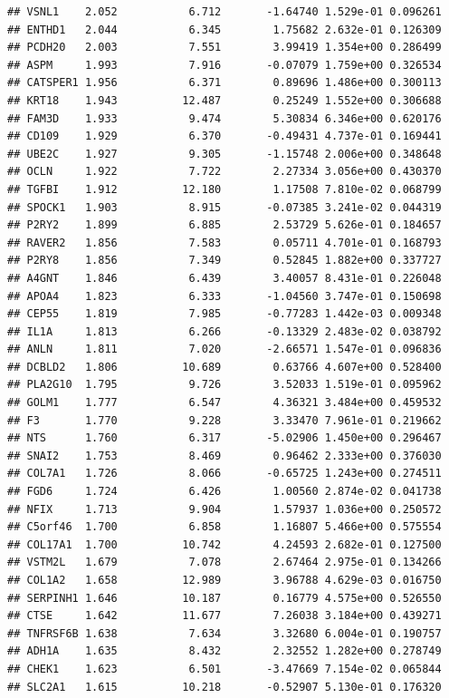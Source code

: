 \documentclass{article}\usepackage[]{graphicx}\usepackage[]{color}
\makeatletter
\newenvironment{kframe}{%
 \def\at@end@of@kframe{}%
 \ifinner\ifhmode%
  \def\at@end@of@kframe{\end{minipage}}%
  \begin{minipage}{\columnwidth}%
 \fi\fi%
 \def\FrameCommand##1{\hskip\@totalleftmargin \hskip-\fboxsep
 \colorbox{shadecolor}{##1}\hskip-\fboxsep
     \hskip-\linewidth \hskip-\@totalleftmargin \hskip\columnwidth}%
 \MakeFramed {\advance\hsize-\width
   \@totalleftmargin\z@ \linewidth\hsize
   \@setminipage}}%
 {\par\unskip\endMakeFramed%
 \at@end@of@kframe}
\newenvironment{knitrout}{}{} %
\makeatother
\begin{document}
\begin{knitrout}
\begin{kframe}
\begin{verbatim}
## VSNL1    2.052           6.712       -1.64740 1.529e-01 0.096261
## ENTHD1   2.044           6.345        1.75682 2.632e-01 0.126309
## PCDH20   2.003           7.551        3.99419 1.354e+00 0.286499
## ASPM     1.993           7.916       -0.07079 1.759e+00 0.326534
## CATSPER1 1.956           6.371        0.89696 1.486e+00 0.300113
## KRT18    1.943          12.487        0.25249 1.552e+00 0.306688
## FAM3D    1.933           9.474        5.30834 6.346e+00 0.620176
## CD109    1.929           6.370       -0.49431 4.737e-01 0.169441
## UBE2C    1.927           9.305       -1.15748 2.006e+00 0.348648
## OCLN     1.922           7.722        2.27334 3.056e+00 0.430370
## TGFBI    1.912          12.180        1.17508 7.810e-02 0.068799
## SPOCK1   1.903           8.915       -0.07385 3.241e-02 0.044319
## P2RY2    1.899           6.885        2.53729 5.626e-01 0.184657
## RAVER2   1.856           7.583        0.05711 4.701e-01 0.168793
## P2RY8    1.856           7.349        0.52845 1.882e+00 0.337727
## A4GNT    1.846           6.439        3.40057 8.431e-01 0.226048
## APOA4    1.823           6.333       -1.04560 3.747e-01 0.150698
## CEP55    1.819           7.985       -0.77283 1.442e-03 0.009348
## IL1A     1.813           6.266       -0.13329 2.483e-02 0.038792
## ANLN     1.811           7.020       -2.66571 1.547e-01 0.096836
## DCBLD2   1.806          10.689        0.63766 4.607e+00 0.528400
## PLA2G10  1.795           9.726        3.52033 1.519e-01 0.095962
## GOLM1    1.777           6.547        4.36321 3.484e+00 0.459532
## F3       1.770           9.228        3.33470 7.961e-01 0.219662
## NTS      1.760           6.317       -5.02906 1.450e+00 0.296467
## SNAI2    1.753           8.469        0.96462 2.333e+00 0.376030
## COL7A1   1.726           8.066       -0.65725 1.243e+00 0.274511
## FGD6     1.724           6.426        1.00560 2.874e-02 0.041738
## NFIX     1.713           9.904        1.57937 1.036e+00 0.250572
## C5orf46  1.700           6.858        1.16807 5.466e+00 0.575554
## COL17A1  1.700          10.742        4.24593 2.682e-01 0.127500
## VSTM2L   1.679           7.078        2.67464 2.975e-01 0.134266
## COL1A2   1.658          12.989        3.96788 4.629e-03 0.016750
## SERPINH1 1.646          10.187        0.16779 4.575e+00 0.526550
## CTSE     1.642          11.677        7.26038 3.184e+00 0.439271
## TNFRSF6B 1.638           7.634        3.32680 6.004e-01 0.190757
## ADH1A    1.635           8.432        2.32552 1.282e+00 0.278749
## CHEK1    1.623           6.501       -3.47669 7.154e-02 0.065844
## SLC2A1   1.615          10.218       -0.52907 5.130e-01 0.176320

\end{verbatim}
\end{kframe}
\end{knitrout}
\end{document}

